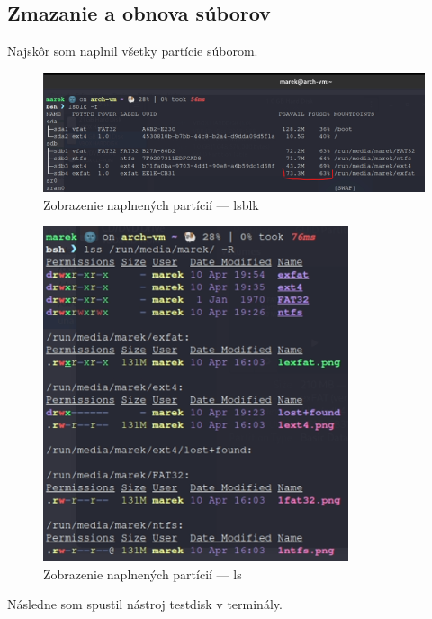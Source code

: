 \documentclass[12pt,oneside,slovak,a4paper]{article}
\begin{document}
\subsection{Zmazanie a obnova súborov}
Najskôr som naplnil všetky partície súborom.

\begin{figure}[H]
	\centering
	\includegraphics[scale=0.8]{./images/testdisk_testing/naplnenie_particii_lsblk.png}
	\centering
	\captionsetup{justification=centering,margin=2cm}
	\caption{Zobrazenie naplnených partícií --- lsblk}
\end{figure}

\begin{figure}[H]
	\centering
	\includegraphics[scale=0.8]{./images/testdisk_testing/naplnenie_particii_lss.png}
	\centering
	\captionsetup{justification=centering,margin=2cm}
	\caption{Zobrazenie naplnených partícií --- ls}
\end{figure}


Následne som spustil nástroj testdisk v terminály.
\end{document}
